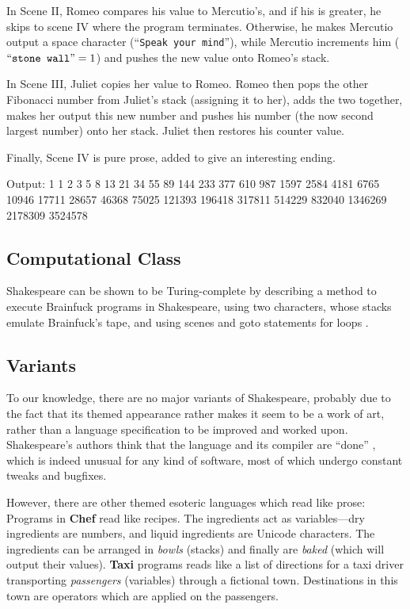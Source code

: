 In Scene II, Romeo compares his value to Mercutio's, and if his is greater, he skips to scene IV where the program terminates. Otherwise, he makes Mercutio output a space character (“\texttt{Speak your mind}”), while Mercutio increments him ($\text{“\texttt{stone wall}”} = 1$) and pushes the new value onto Romeo's stack.



In Scene III, Juliet copies her value to Romeo. Romeo then pops the other Fibonacci number from Juliet's stack (assigning it to her), adds the two together, makes her output this new number and pushes his number (the now second largest number) onto her stack. Juliet then restores his counter value.



Finally, Scene IV is pure prose, added to give an interesting ending.



\begin{io}
Output:
1 1 2 3 5 8 13 21 34 55 89 144 233 377 610 987 1597 2584
4181 6765 10946 17711 28657 46368 75025 121393 196418
317811 514229 832040 1346269 2178309 3524578
\end{io}

\subsection{Computational Class}

Shakespeare can be shown to be Turing-complete by describing a method to execute Brainfuck programs in Shakespeare, using two characters, whose stacks emulate Brainfuck's tape, and using scenes and goto statements for loops \cite{stux2005shakespeare}.

\subsection{Variants}

To our knowledge, there are no major variants of Shakespeare, probably due to the fact that its themed appearance rather makes it seem to be a work of art, rather than a language specification to be improved and worked upon. Shakespeare's authors think that the language and its compiler are “done” \cite{herrick2011az}, which is indeed unusual for any kind of software, most of which undergo constant tweaks and bugfixes.

However, there are other themed esoteric languages which read like prose: Programs in \textbf{Chef} read like recipes. The ingredients act as variables---dry ingredients are numbers, and liquid ingredients are Unicode characters. The ingredients can be arranged in \emph{bowls} (stacks) and finally are \emph{baked} (which will output their values). \textbf{Taxi} programs reads like a list of directions for a taxi driver transporting \emph{passengers} (variables) through a fictional town. Destinations in this town are operators which are applied on the passengers.

